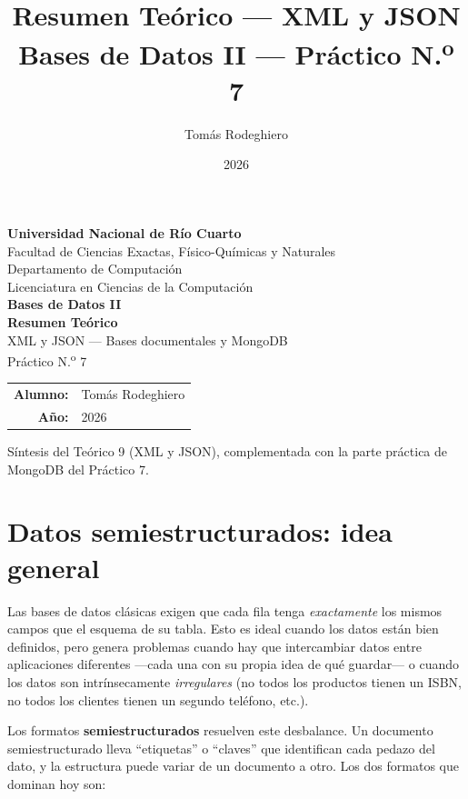 \documentclass[11pt,a4paper]{article}
\title{Resumen Teórico --- XML y JSON\\[4pt]
       \large Bases de Datos II --- Práctico N.\textsuperscript{o} 7}
\author{Tomás Rodeghiero}
\date{2026}
\begin{document}
\begin{titlepage}
    \centering
    \vspace*{1.5cm}

    {\large \textbf{Universidad Nacional de Río Cuarto}}\\[6pt]
    {\normalsize Facultad de Ciencias Exactas, Físico-Químicas y Naturales}\\[4pt]
    {\normalsize Departamento de Computación}\\[4pt]
    {\normalsize Licenciatura en Ciencias de la Computación}\\[3cm]

    {\Large \textbf{Bases de Datos II}}\\[1.2cm]

    {\Large \textbf{Resumen Teórico}}\\[6pt]
    {\large XML y JSON --- Bases documentales y MongoDB\\[2pt]
    Práctico N.\textsuperscript{o} 7}\\[3cm]

    \begin{tabular}{rl}
        \textbf{Alumno:} & Tomás Rodeghiero \\[4pt]
        \textbf{Año:}    & 2026 \\
    \end{tabular}

    \vfill
    {\small Síntesis del Teórico 9 (XML y JSON), complementada con la
    parte práctica de MongoDB del Práctico 7.}
\end{titlepage}

\tableofcontents
\newpage

\section{Datos semiestructurados: idea general}

Las bases de datos clásicas exigen que cada fila tenga \emph{exactamente}
los mismos campos que el esquema de su tabla. Esto es ideal cuando los
datos están bien definidos, pero genera problemas cuando hay que
intercambiar datos entre aplicaciones diferentes ---cada una con su
propia idea de qué guardar--- o cuando los datos son intrínsecamente
\emph{irregulares} (no todos los productos tienen un ISBN, no todos los
clientes tienen un segundo teléfono, etc.).

Los formatos \textbf{semiestructurados} resuelven este desbalance. Un
documento semiestructurado lleva ``etiquetas'' o ``claves'' que
identifican cada pedazo del dato, y la estructura puede variar de un
documento a otro. Los dos formatos que dominan hoy son:
\end{document}
